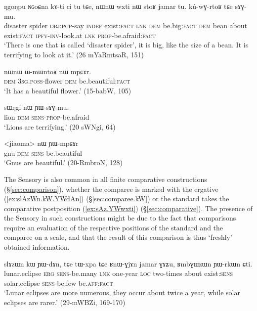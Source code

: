  \begin{exe}
\ex \label{ex:sAGmu}
\gll  ŋgoŋpu ɴɢoɕna kɤ-ti ci tu tɕe, nɯnɯ wxti nɯ stoʁ jamar tu. kú-wɣ-rtoʁ tɕe sɤɣ-mu. \\
disaster spider \textsc{obj}:\textsc{pcp}-say \textsc{indef} exist:\textsc{fact} \textsc{lnk} \textsc{dem} be.big:\textsc{fact}  \textsc{dem} bean about exist:\textsc{fact} \textsc{ipfv}-\textsc{inv}-look.at \textsc{lnk} \textsc{prop}-be.afraid:\textsc{fact} \\
\glt `There is one that is  called `disaster spider', it is big, like the size of a bean. It is terrifying to look at it.' (26 mYaRmtsaR, 151)
\end{exe}


\begin{exe}
\ex \label{ex:mpCAr}
\gll nɯnɯ ɯ-mɯntoʁ nɯ mpɕɤr. \\
\textsc{dem} \textsc{3sg}.\textsc{poss}-flower \textsc{dem} be.beautiful:\textsc{fact} \\
\glt `It has a beautiful flower.' (15-babW, 105)
\end{exe}

\begin{exe}
	\ex \label{ex:YWsAGmu}
	\gll  sɯŋgi nɯ ɲɯ-sɤɣ-mu. \\
	lion \textsc{dem} \textsc{sens}-\textsc{prop}-be.afraid \\
	\glt `Lions are terrifying.' (20 sWNgi, 64)
\end{exe}

\begin{exe}
\ex \label{ex:YWmpCAr}
\gll <jiaoma> nɯ ɲɯ-mpɕɤr \\
gnu \textsc{dem} \textsc{sens}-be.beautiful \\
\glt `Gnus are beautiful.' (20-RmbroN, 128)
\end{exe}

The Sensory is also common in all finite comparative constructions (§\ref{sec:comparison}), whether the comparee is marked with the ergative (\ref{ex:slAzWn.kW.YWdAn}) (§\ref{sec:comparee.kW}) or the standard takes the comparative postposition (\ref{ex:sAz.YWwxti}) (§\ref{sec:comparative}). The presence of the Sensory in such constructions might be due to the fact that comparisons require an evaluation of the respective positions of the standard and the comparee on a scale, and that the result of this comparison is thus `freshly' obtained information.

\begin{exe}
\ex \label{ex:slAzWn.kW.YWdAn}
\gll slɤzɯn kɯ ɲɯ-dɤn, tɕe tɯ-xpa tɕe ʁnɯ-ɣjɤn jamar ɣɤʑu, ʁmbɣɯzɯn ɲɯ-rkɯn ɕti. \\
lunar.eclipse \textsc{erg} \textsc{sens}-be.many \textsc{lnk} one-year \textsc{loc} two-times about exist:\textsc{sens} solar.eclipse \textsc{sens}-be.few be.\textsc{aff}:\textsc{fact} \\
\glt `Lunar eclipses are more numerous, they occur about twice a year, while solar eclipses are rarer.' (29-mWBZi, 169-170)
\end{exe}

